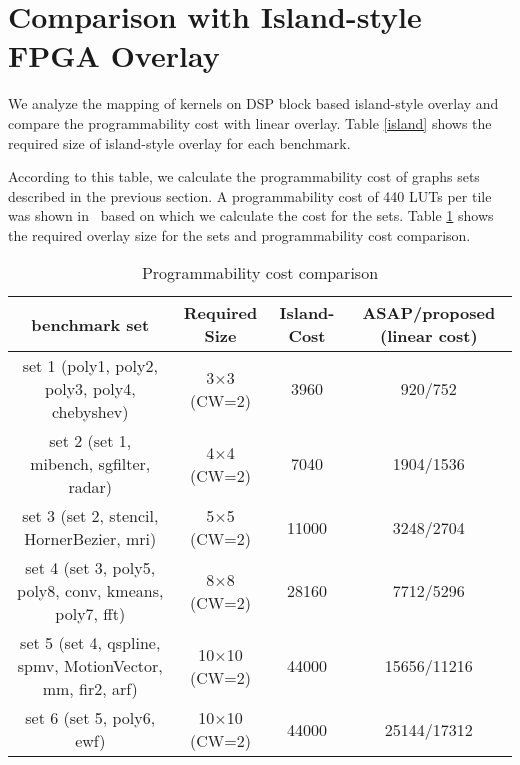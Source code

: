 

\section{Comparison with Island-style FPGA Overlay}
We analyze the mapping of kernels on DSP block based island-style overlay and compare the programmability cost with linear overlay.
Table \ref{island} shows the required size of island-style overlay for each benchmark.



According to this table, we calculate the programmability cost of graphs sets described in the previous section.
A programmability cost of 440 LUTs per tile was shown in~\cite{fccm2015-jain} based on which we calculate the cost for the sets.
Table \ref{cost_comparison} shows the required overlay size for the sets and programmability cost comparison.

\begin{table}[!h]
	\renewcommand{\arraystretch}{1.3}
	\caption{Programmability cost comparison}
	\label{cost_comparison}
	\centering
	\tiny
	\begin{tabular}{cccc}
		\toprule
		benchmark set 															& Required Size			& Island-Cost 			& ASAP/proposed (linear cost)				\\
		\midrule                                                                                                                      
		set 1 (poly1, poly2, poly3, poly4, chebyshev)   						& 3$\times$3  (CW=2)	& 3960              	& 920/752              						\\
		set 2 (set 1, mibench, sgfilter, radar)			       					& 4$\times$4  (CW=2)	& 7040              	& 1904/1536                             	\\                           
		set 3 (set 2, stencil, HornerBezier, mri)		             			& 5$\times$5  (CW=2)	& 11000              	& 3248/2704                           		\\
		set 4 (set 3, poly5, poly8, conv, kmeans, poly7, fft) 					& 8$\times$8  (CW=2)	& 28160 				& 7712/5296									\\
		set 5 (set 4, qspline, spmv, MotionVector, mm, fir2, arf) 				& 10$\times$10  (CW=2)	& 44000 				& 15656/11216								\\ 
		set 6 (set 5, poly6, ewf)   											& 10$\times$10  (CW=2)	& 44000             	& 25144/17312                     			\\
		\bottomrule                                                                             
		
	\end{tabular}
\end{table}

